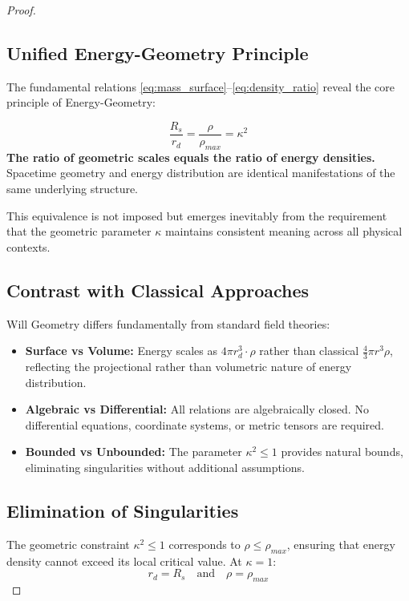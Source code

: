 \documentclass{article}
\begin{document}
\begin{proof}
\begin{center}
\end{center}


\subsection{Unified Energy-Geometry Principle}

The fundamental relations \eqref{eq:mass_surface}–\eqref{eq:density_ratio} reveal the core principle of Energy-Geometry:

\begin{tcolorbox}[colback=gray!5, colframe=black!80!black, title=Will Geometry Equivalence]
\[
\boxed{
\frac{R_s}{r_{d}} = \frac{\rho}{\rho_{max}} = \kappa^2
}
\]
\textbf{The ratio of geometric scales equals the ratio of energy densities.}\\
Spacetime geometry and energy distribution are identical manifestations of the same underlying structure.
\end{tcolorbox}

This equivalence is not imposed but emerges inevitably from the requirement that the geometric parameter $\kappa$ maintains consistent meaning across all physical contexts.

\subsection{Contrast with Classical Approaches}
Will Geometry differs fundamentally from standard field theories:

\begin{itemize}
\item \textbf{Surface vs Volume:} Energy scales as $4 \pi r_{d}^3 \cdot\rho$ rather than classical $\frac{4}{3}\pi r^3 \rho$, reflecting the projectional rather than volumetric nature of energy distribution.

\item \textbf{Algebraic vs Differential:} All relations are algebraically closed. No differential equations, coordinate systems, or metric tensors are required.

\item \textbf{Bounded vs Unbounded:} The parameter $\kappa^2 \leq 1$ provides natural bounds, eliminating singularities without additional assumptions.
\end{itemize}

\subsection{Elimination of Singularities}
The geometric constraint $\kappa^2 \leq 1$ corresponds to $\rho \leq \rho_{max}$, ensuring that energy density cannot exceed its local critical value. At $\kappa = 1$:
\[
r_{d} = R_s \quad \text{and} \quad \rho = \rho_{max}
\]


\end{proof}
\end{document}
